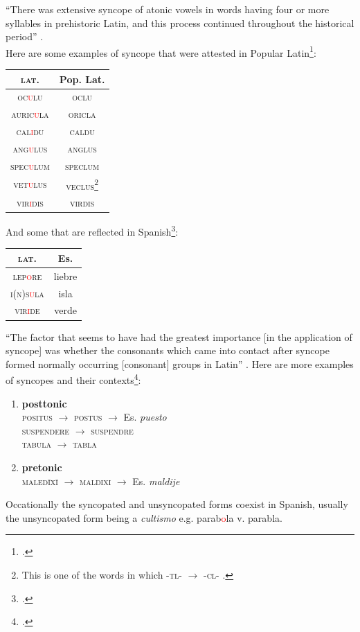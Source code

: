 \documentclass{report}[12pt]
\begin{document}
``There was extensive syncope of atonic vowels in words having four or more syllables in prehistoric Latin, and this process continued throughout the historical period'' \parencite[p.~113]{lloyd_spanish}. \\
Here are some examples of syncope that were attested in Popular Latin\footcites[p.~28-29]{romance_his}[p.~114]{lloyd_spanish}:
\begin{center}
\begin{tabular}{c c}
  \textsc{lat.} & Pop. Lat. \\
  \hline
  \textsc{oc\textcolor{red}{u}lu} & \textsc{oclu} \\
  \textsc{auric\textcolor{red}{u}la} & \textsc{oricla} \\
  \textsc{cal\textcolor{red}{i}du} & \textsc{caldu} \\
  \textsc{ang\textcolor{red}{u}lus} & \textsc{anglus} \\
  \textsc{spec\textcolor{red}{u}lum} & \textsc{speclum} \\
  \textsc{vet\textcolor{red}{u}lus} & \textsc{veclus}\footnote{This is one of the words in which \textsc{-tl-} $\rightarrow$ \textsc{-cl-} \parencite[p.~68]{romance_his}.} \\
  \textsc{vir\textcolor{red}{i}dis} & \textsc{virdis} \\
\end{tabular}
\end{center}
And some that are reflected in Spanish\footcite[p.~29]{romance_his}:
\begin{center}
\begin{tabular}{c c}
  \textsc{lat.} & Es. \\
  \hline
  \textsc{lep\textcolor{red}{o}re} & liebre \\
  \textsc{i(n)s\textcolor{red}{u}la} & isla \\
  \textsc{vir\textcolor{red}{i}de} & verde \\
\end{tabular}
\end{center}
``The factor that seems to have had the greatest importance [in the application of syncope] was whether the consonants which came into contact after syncope formed normally occurring [consonant] groups in Latin'' \parencite[p.~114]{lloyd_spanish}. Here are more examples of syncopes and their contexts\footcite[p.~114]{lloyd_spanish}:
\begin{enumerate}
  \item \textbf{posttonic} \\
  \textsc{positus} $\rightarrow$ \textsc{postus} $\rightarrow$ Es. \emph{puesto} \\
  \textsc{suspendere} $\rightarrow$ \textsc{suspendre} \\
  \textsc{tabula} $\rightarrow$ \textsc{tabla}
  \item \textbf{pretonic} \\
  \textsc{maled\={i}x\={i}} $\rightarrow$ \textsc{maldixi} $\rightarrow$ Es. \emph{maldije}
\end{enumerate}
Occationally the syncopated and unsyncopated forms coexist in Spanish, usually the unsyncopated form being a \emph{cultismo} e.g. parab\textcolor{red}{o}la v. parabla. \\
\end{document}
